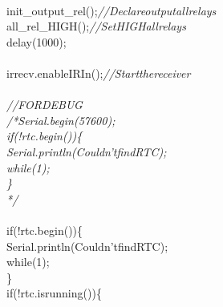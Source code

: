 \documentclass[a4paper, 12pt]{article}
\newcommand\SPC{\hspace*{0.6em}}
\newcommand\QOT{\mbox{\char 34}}
\newcommand{\CppAComment}[1]{\textit{\textcolor[rgb]{0.2,0.4,1}{#1}}}
\newcommand{\CppAIdentifier}[1]{\textcolor[rgb]{0,1,0}{#1}}
\newcommand{\CppANumber}[1]{\textcolor[rgb]{0,0,1}{#1}}
\newcommand{\CppAReservedWord}[1]{\textcolor[rgb]{0,0.5,0}{#1}}
\newcommand{\CppASpace}[1]{\textcolor[rgb]{1,1,1}{\colorbox[rgb]{0,0,0}{#1}}}
\newcommand{\CppAString}[1]{\textcolor[rgb]{0.76,0.76,0.76}{#1}}
\newcommand{\CppASymbol}[1]{\textcolor[rgb]{1,0,0}{#1}}
\begin{document}
\begin{ttfamily}
\CppASpace{\SPC \SPC }\\
\CppASpace{\SPC \SPC }\CppAIdentifier{init\_output\_rel}\CppASymbol{(}\CppASymbol{)}\CppASymbol{;}\CppASpace{\SPC }\CppAComment{//Declare\SPC output\SPC all\SPC relays}\\
\CppASpace{\SPC \SPC }\CppAIdentifier{all\_rel\_HIGH}\CppASymbol{(}\CppASymbol{)}\CppASymbol{;}\CppASpace{\SPC \SPC \SPC \SPC }\CppAComment{//Set\SPC HIGH\SPC all\SPC relays}\\
\CppASpace{\SPC \SPC }\CppAIdentifier{delay}\CppASymbol{(}\CppANumber{1000}\CppASymbol{)}\CppASymbol{;}\\
\\
\CppASpace{\SPC \SPC }\CppAIdentifier{irrecv}\CppASymbol{.}\CppAIdentifier{enableIRIn}\CppASymbol{(}\CppASymbol{)}\CppASymbol{;}\CppASpace{\SPC }\CppAComment{//\SPC Start\SPC the\SPC receiver}\\
\CppASpace{\SPC \SPC }\\
\CppASpace{\SPC \SPC }\CppAComment{//FOR\SPC DEBUG\SPC }\\
\CppASpace{\SPC \SPC }\CppAComment{/*\SPC Serial.begin(57600);}\\
\CppAComment{\SPC \SPC if\SPC (!\SPC rtc.begin())\SPC \{}\\
\CppAComment{\SPC \SPC \SPC \SPC Serial.println(\QOT Couldn't\SPC find\SPC RTC\QOT );}\\
\CppAComment{\SPC \SPC \SPC \SPC while\SPC (1);}\\
\CppAComment{\SPC \SPC \}}\\
\CppAComment{\SPC \SPC */}\\
\\
\CppASpace{\SPC \SPC }\CppAReservedWord{if}\CppASpace{\SPC }\CppASymbol{(}\CppASymbol{!}\CppASpace{\SPC }\CppAIdentifier{rtc}\CppASymbol{.}\CppAIdentifier{begin}\CppASymbol{(}\CppASymbol{)}\CppASymbol{)}\CppASpace{\SPC }\CppASymbol{\{}\\
\CppASpace{\SPC \SPC }\CppAIdentifier{Serial}\CppASymbol{.}\CppAIdentifier{println}\CppASymbol{(}\CppAString{\QOT Couldn't\SPC find\SPC RTC\QOT }\CppASymbol{)}\CppASymbol{;}\\
\CppASpace{\SPC \SPC }\CppAReservedWord{while}\CppASpace{\SPC }\CppASymbol{(}\CppANumber{1}\CppASymbol{)}\CppASymbol{;}\\
\CppASpace{\SPC \SPC }\CppASymbol{\}}\\
\CppASpace{\SPC \SPC }\CppAReservedWord{if}\CppASpace{\SPC }\CppASymbol{(}\CppASymbol{!}\CppASpace{\SPC }\CppAIdentifier{rtc}\CppASymbol{.}\CppAIdentifier{isrunning}\CppASymbol{(}\CppASymbol{)}\CppASymbol{)}\CppASpace{\SPC }\CppASymbol{\{}\\

\end{ttfamily}
\end{document}
